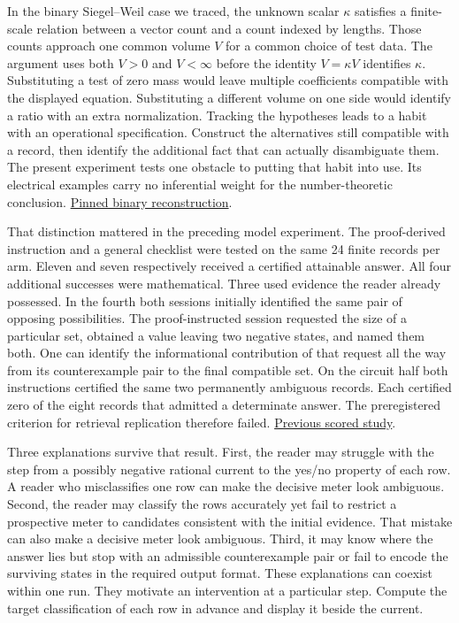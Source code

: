 \documentclass[12pt,letterpaper]{article}
\begin{document}
In the binary Siegel--Weil case we traced, the unknown scalar $\kappa$ satisfies a finite-scale relation between a vector count and a count indexed by lengths. Those counts approach one common volume $V$ for a common choice of test data. The argument uses both $V>0$ and $V<\infty$ before the identity $V=\kappa V$ identifies $\kappa$. Substituting a test of zero mass would leave multiple coefficients compatible with the displayed equation. Substituting a different volume on one side would identify a ratio with an extra normalization. Tracking the hypotheses leads to a habit with an operational specification. Construct the alternatives still compatible with a record, then identify the additional fact that can actually disambiguate them. The present experiment tests one obstacle to putting that habit into use. Its electrical examples carry no inferential weight for the number-theoretic conclusion. \href{https://github.com/nousentllc/riemann-hypothesis/blob/42b3ce4890b5c6a584af26d34bbc54f177517871/research/uriel/experiments/binary-proof-audit-transfer/binary/README.md}{Pinned binary reconstruction}.

That distinction mattered in the preceding model experiment. The proof-derived instruction and a general checklist were tested on the same 24 finite records per arm. Eleven and seven respectively received a certified attainable answer. All four additional successes were mathematical. Three used evidence the reader already possessed. In the fourth both sessions initially identified the same pair of opposing possibilities. The proof-instructed session requested the size of a particular set, obtained a value leaving two negative states, and named them both. One can identify the informational contribution of that request all the way from its counterexample pair to the final compatible set. On the circuit half both instructions certified the same two permanently ambiguous records. Each certified zero of the eight records that admitted a determinate answer. The preregistered criterion for retrieval replication therefore failed. \href{https://github.com/nousentllc/riemann-hypothesis/tree/42b3ce4890b5c6a584af26d34bbc54f177517871/research/uriel/experiments/binary-proof-audit-transfer}{Previous scored study}.

Three explanations survive that result. First, the reader may struggle with the step from a possibly negative rational current to the yes/no property of each row. A reader who misclassifies one row can make the decisive meter look ambiguous. Second, the reader may classify the rows accurately yet fail to restrict a prospective meter to candidates consistent with the initial evidence. That mistake can also make a decisive meter look ambiguous. Third, it may know where the answer lies but stop with an admissible counterexample pair or fail to encode the surviving states in the required output format. These explanations can coexist within one run. They motivate an intervention at a particular step. Compute the target classification of each row in advance and display it beside the current.
\end{document}
